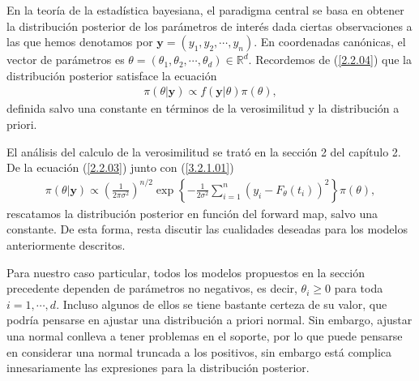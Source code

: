 En la teoría de la estadística bayesiana, el paradigma central se basa en obtener la distribución posterior de los parámetros de interés dada ciertas observaciones a las que hemos denotamos por $\mathbf{y} = (y_1,y_2,\cdots, y_n)$. 
En coordenadas canónicas, el vector de parámetros es $\theta = (\theta_1,\theta_2, \cdots, \theta_d) \in \mathbb{R}^d$. Recordemos de (\ref{2.2.04}) que la distribución posterior satisface la ecuación  
\begin{align}
    \pi(\theta|\mathbf{y}) \propto f(\mathbf{y}|\theta) \pi(\theta),
    \label{3.2.1.01}
\end{align} 
definida salvo una constante en términos de la verosimilitud y la distribución a priori. 

El análisis del calculo de la verosimilitud se trató en la sección 2 del capítulo 2. De la ecuación (\ref{2.2.03}) junto con (\ref{3.2.1.01})
\begin{align}
    \pi(\theta|\mathbf{y}) \propto \left(\frac{1}{2\pi \sigma^2}\right) ^{n/2}\exp \left \{  -\frac{1}{2\sigma^2}\sum_{i = 1}^{n} \left(y_i - F_{\theta}(t_i)\right)^2 \right \} \pi(\theta),
    \label{3.2.1.02}
\end{align}
rescatamos la distribución posterior en función del forward map, salvo una constante. De esta forma, resta discutir las cualidades deseadas para los modelos anteriormente descritos.


Para nuestro caso particular, todos los modelos propuestos en la sección precedente dependen de parámetros no negativos, es decir, $\theta_i \geq 0$ para toda $i = 1,\cdots, d$. Incluso algunos de ellos se tiene bastante certeza de su valor, que podría pensarse en ajustar una distribución a priori normal. Sin embargo, ajustar una normal conlleva a tener problemas en el soporte, por lo que puede pensarse en considerar una normal truncada a los positivos, sin embargo está complica innesariamente las expresiones para la distribución posterior. 

